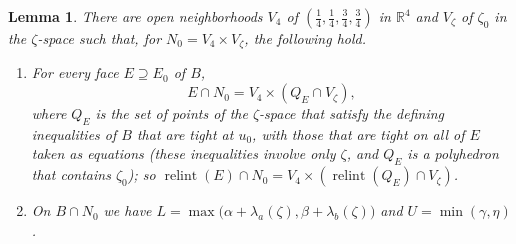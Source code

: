 \documentclass[11pt]{article}
\newtheorem{lemma}[theorem]{Lemma}
\theoremstyle{definition}
\theoremstyle{remark}
\newcommand{\relint}{\operatorname{relint}}
\begin{document}
\begin{lemma}\label{lem:product}
There are open neighborhoods $V_4$ of $(\frac14,\frac14,\frac34,\frac34)$ in $\mathbb R^4$ and $V_\zeta$ of $\zeta_0$ in the $\zeta$-space such that, for $N_0=V_4\times V_\zeta$, the following hold.
\begin{enumerate}
\item[(a)] For every face $E\supseteq E_0$ of $B$,
\begin{equation}\label{eq:product}
E\cap N_0=V_4\times(Q_E\cap V_\zeta),
\end{equation}
where $Q_E$ is the set of points of the $\zeta$-space that satisfy the defining inequalities of $B$ that are tight at $u_0$, with those that are tight on all of $E$ taken as equations (these inequalities involve only $\zeta$, and $Q_E$ is a polyhedron that contains $\zeta_0$); so
$\relint(E)\cap N_0=V_4\times(\relint(Q_E)\cap V_\zeta)$.
\item[(b)] On $B\cap N_0$ we have
$L=\max\bigl(\alpha+\lambda_a(\zeta),\beta+\lambda_b(\zeta)\bigr)$ and
$U=\min(\gamma,\eta)$.
\end{enumerate}
\end{lemma}
\end{document}
